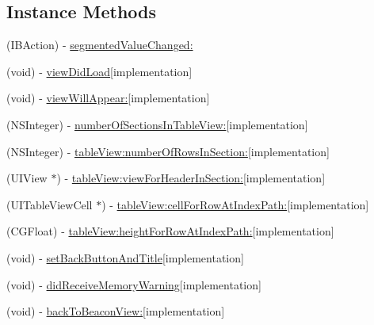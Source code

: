 \subsection*{Instance Methods}
\begin{DoxyCompactItemize}
\item 
(I\+B\+Action) -\/ \hyperlink{interface_patient_view_controller_a39180db40fe5c4aa670e805383f2d621}{segmented\+Value\+Changed\+:}
\item 
(void) -\/ \hyperlink{interface_patient_view_controller_a4087b7d6a65a276e66dc9fdbc55057b7}{view\+Did\+Load}{\ttfamily  \mbox{[}implementation\mbox{]}}
\item 
(void) -\/ \hyperlink{interface_patient_view_controller_a5c9ba66c80aac5155bd017122c01cce2}{view\+Will\+Appear\+:}{\ttfamily  \mbox{[}implementation\mbox{]}}
\item 
(N\+S\+Integer) -\/ \hyperlink{interface_patient_view_controller_a4516edb72f52ef86133ea78631f23b57}{number\+Of\+Sections\+In\+Table\+View\+:}{\ttfamily  \mbox{[}implementation\mbox{]}}
\item 
(N\+S\+Integer) -\/ \hyperlink{interface_patient_view_controller_af858a4e4476874cd85526f151c9d9f35}{table\+View\+:number\+Of\+Rows\+In\+Section\+:}{\ttfamily  \mbox{[}implementation\mbox{]}}
\item 
(U\+I\+View $\ast$) -\/ \hyperlink{interface_patient_view_controller_a472e03fb9fcdbfe411abdc91ed75a52a}{table\+View\+:view\+For\+Header\+In\+Section\+:}{\ttfamily  \mbox{[}implementation\mbox{]}}
\item 
(U\+I\+Table\+View\+Cell $\ast$) -\/ \hyperlink{interface_patient_view_controller_a0c4ebed4816b9b2d44e86c0caa6519c9}{table\+View\+:cell\+For\+Row\+At\+Index\+Path\+:}{\ttfamily  \mbox{[}implementation\mbox{]}}
\item 
(C\+G\+Float) -\/ \hyperlink{interface_patient_view_controller_ab30073723a599de8ccbb7d86656562ff}{table\+View\+:height\+For\+Row\+At\+Index\+Path\+:}{\ttfamily  \mbox{[}implementation\mbox{]}}
\item 
(void) -\/ \hyperlink{interface_patient_view_controller_a92a3843d8e1210f126ee995308bee690}{set\+Back\+Button\+And\+Title}{\ttfamily  \mbox{[}implementation\mbox{]}}
\item 
(void) -\/ \hyperlink{interface_patient_view_controller_ad92d050cac572fd5870193412a3ea81a}{did\+Receive\+Memory\+Warning}{\ttfamily  \mbox{[}implementation\mbox{]}}
\item 
(void) -\/ \hyperlink{interface_patient_view_controller_a5eae666e1f431ef996ce222909697dc9}{back\+To\+Beacon\+View\+:}{\ttfamily  \mbox{[}implementation\mbox{]}}

\end{DoxyCompactItemize}
